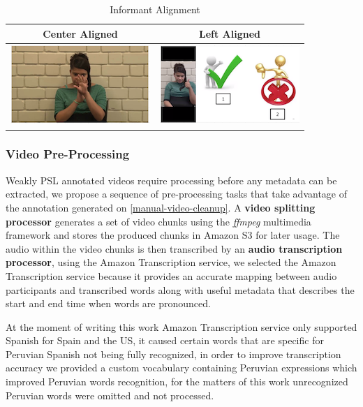 \documentclass[twocolumn,conference]{article}
\begin{document}
\begin{table}[!htb]
\captionsetup{font=footnotesize}
\centering
\begin{tabular}{cc}
\toprule
\multicolumn{1}{c}{\textbf{Center Aligned}} & 
	\multicolumn{1}{c}{\textbf{Left Aligned}}\\
\midrule
\includegraphics{images/informant-center-alignment.png}& \includegraphics{images/informant-left-alignment.png}\\
\bottomrule
\end{tabular}
\caption{Informant Alignment} \label{table:informant-alignment}
\end{table}

\subsubsection{Video Pre-Processing}\label{video-pre-processing}
Weakly PSL annotated videos require processing before any metadata can be extracted, we propose a sequence of pre-processing tasks that take advantage of the annotation generated on \ref{manual-video-cleanup}. A \textbf{video splitting processor} generates a set of video chunks using the \textit{ffmpeg} multimedia framework and stores the produced chunks in Amazon S3 for later usage. The audio within the video chunks is then transcribed by an \textbf{audio transcription processor}, using the Amazon Transcription service, we selected the Amazon Transcription service because it provides an accurate mapping between audio participants and transcribed words along with useful metadata that describes the start and end time when words are pronounced. 

At the moment of writing this work Amazon Transcription service only supported Spanish for Spain and the US, it caused certain words that are specific for Peruvian Spanish not being fully recognized, in order to improve transcription accuracy we provided a custom vocabulary containing Peruvian expressions which improved  Peruvian words recognition, for the matters of this work unrecognized Peruvian words were omitted and not processed.
\end{document}
